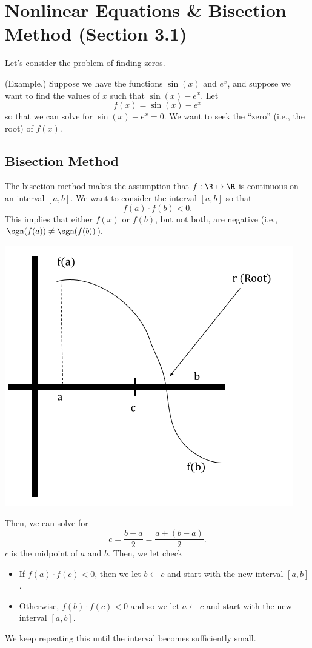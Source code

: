 \documentclass[letterpaper]{article}
\begin{document}
\section{Nonlinear Equations \& Bisection Method (Section 3.1)}
Let's consider the problem of finding zeros.

\begin{mdframed}
    (Example.) Suppose we have the functions $\sin(x)$ and $e^x$, and suppose we want to find the values of $x$ such that $\sin(x) - e^x$. Let \[f(x) = \sin(x) - e^x\] so that we can solve for $\sin(x) - e^x = 0$. We want to seek the ``zero'' (i.e., the root) of $f(x)$. 
\end{mdframed}

\subsection{Bisection Method}
The bisection method makes the assumption that $f: \R \mapsto \R$ is \underline{continuous} on an interval $[a, b]$. We want to consider the interval $[a, b]$ so that \[f(a) \cdot f(b) < 0.\] This implies that either $f(x)$ or $f(b)$, but not both, are negative (i.e., $\sgn(f(a)) \neq \sgn(f(b))$).

\begin{center}
    \includegraphics[scale=0.6]{../assets/bisect.png}
\end{center}

Then, we can solve for 
\[c = \frac{b + a}{2} = \frac{a + (b - a)}{2}.\]
$c$ is the midpoint of $a$ and $b$. Then, we let check 
\begin{itemize}
    \item If $f(a) \cdot f(c) < 0$, then we let $b \leftarrow c$ and start with the new interval $[a, b]$. 
    \item Otherwise, $f(b) \cdot f(c) < 0$ and so we let $a \leftarrow c$ and start with the new interval $[a, b]$. 
\end{itemize}
We keep repeating this until the interval becomes sufficiently small. 
\end{document}
